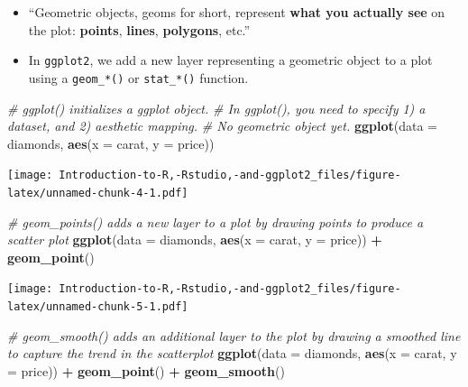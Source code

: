 \documentclass[]{book}
\newenvironment{Shaded}{\begin{snugshade}}{\end{snugshade}}
\newcommand{\CommentTok}[1]{\textcolor[rgb]{0.56,0.35,0.01}{\textit{#1}}}
\newcommand{\DataTypeTok}[1]{\textcolor[rgb]{0.13,0.29,0.53}{#1}}
\newcommand{\KeywordTok}[1]{\textcolor[rgb]{0.13,0.29,0.53}{\textbf{#1}}}
\newcommand{\NormalTok}[1]{#1}
\newcommand{\OperatorTok}[1]{\textcolor[rgb]{0.81,0.36,0.00}{\textbf{#1}}}
\newcommand{\StringTok}[1]{\textcolor[rgb]{0.31,0.60,0.02}{#1}}
\providecommand{\tightlist}{%
  \setlength{\itemsep}{0pt}\setlength{\parskip}{0pt}}
\begin{document}
\begin{itemize}
\tightlist
\item
  ``Geometric objects, geoms for short, represent \textbf{what you actually see} on the plot: \textbf{points}, \textbf{lines}, \textbf{polygons}, etc.'' \citep{ggplot2}
\item
  In \texttt{ggplot2}, we add a new layer representing a geometric object to a plot using a \texttt{geom\_*()} or \texttt{stat\_*()} function.
\end{itemize}

\begin{Shaded}
\begin{Highlighting}[]
\CommentTok{# ggplot() initializes a ggplot object.}
\CommentTok{# In ggplot(), you need to specify 1) a dataset, and 2) aesthetic mapping. }
\CommentTok{# No geometric object yet. }
\KeywordTok{ggplot}\NormalTok{(}\DataTypeTok{data =}\NormalTok{ diamonds, }\KeywordTok{aes}\NormalTok{(}\DataTypeTok{x =}\NormalTok{ carat, }\DataTypeTok{y =}\NormalTok{ price))}
\end{Highlighting}
\end{Shaded}

\texttt{[image: Introduction-to-R,-Rstudio,-and-ggplot2\_files/figure-latex/unnamed-chunk-4-1.pdf]}

\begin{Shaded}
\begin{Highlighting}[]
\CommentTok{# geom_points() adds a new layer to a plot by drawing points to produce a scatter plot }
\KeywordTok{ggplot}\NormalTok{(}\DataTypeTok{data =}\NormalTok{ diamonds, }\KeywordTok{aes}\NormalTok{(}\DataTypeTok{x =}\NormalTok{ carat, }\DataTypeTok{y =}\NormalTok{ price)) }\OperatorTok{+}\StringTok{ }\KeywordTok{geom_point}\NormalTok{()}
\end{Highlighting}
\end{Shaded}

\texttt{[image: Introduction-to-R,-Rstudio,-and-ggplot2\_files/figure-latex/unnamed-chunk-5-1.pdf]}

\begin{Shaded}
\begin{Highlighting}[]
\CommentTok{# geom_smooth() adds an additional layer to the plot by drawing a smoothed line to capture the trend in the scatterplot}
\KeywordTok{ggplot}\NormalTok{(}\DataTypeTok{data =}\NormalTok{ diamonds, }\KeywordTok{aes}\NormalTok{(}\DataTypeTok{x =}\NormalTok{ carat, }\DataTypeTok{y =}\NormalTok{ price)) }\OperatorTok{+}\StringTok{ }\KeywordTok{geom_point}\NormalTok{() }\OperatorTok{+}\StringTok{ }\KeywordTok{geom_smooth}\NormalTok{()}
\end{Highlighting}
\end{Shaded}
\end{document}

